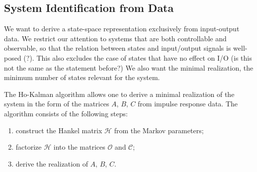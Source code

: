 

\subsection{System Identification from Data}
\label{sec:ho-kalman-algorithm}

We want to derive a state-space representation exclusively from input-output data. We restrict our attention to systems that are both controllable and observable, so that the relation between states and input/output signals is well-posed (?). This also excludes the case of states that have no effect on I/O (is this not the same as the statement before?) We also want the minimal realization, the minimum number of states relevant for the system.

The Ho-Kalman algorithm allows one to derive a minimal realization of the system in the form of the matrices $A$, $B$, $C$ from impulse response data. The algorithm consists of the following steps:
\begin{enumerate}
\item construct the Hankel matrix $\mathcal{H}$ from the Markov parameters;
\item factorize $\mathcal{H}$ into the matrices $\mathcal{O}$ and $\mathcal{C}$;
\item derive the realization of $A$, $B$, $C$.
\end{enumerate}


